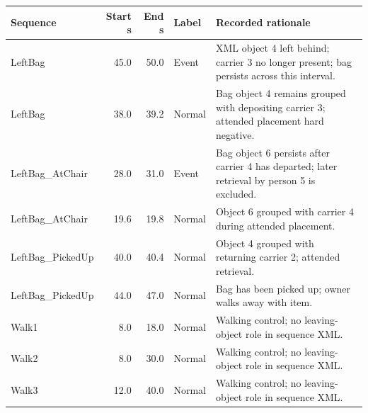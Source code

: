 \begin{longtable}{lrrlp{7cm}}
\toprule
Sequence & Start s & End s & Label & Recorded rationale \\
\midrule\endhead
LeftBag & 45.0 & 50.0 & Event & XML object 4 left behind; carrier 3 no longer present; bag persists across this interval. \\
LeftBag & 38.0 & 39.2 & Normal & Bag object 4 remains grouped with depositing carrier 3; attended placement hard negative. \\
LeftBag\_AtChair & 28.0 & 31.0 & Event & Bag object 6 persists after carrier 4 has departed; later retrieval by person 5 is excluded. \\
LeftBag\_AtChair & 19.6 & 19.8 & Normal & Object 6 grouped with carrier 4 during attended placement. \\
LeftBag\_PickedUp & 40.0 & 40.4 & Normal & Object 4 grouped with returning carrier 2; attended retrieval. \\
LeftBag\_PickedUp & 44.0 & 47.0 & Normal & Bag has been picked up; owner walks away with item. \\
Walk1 & 8.0 & 18.0 & Normal & Walking control; no leaving-object role in sequence XML. \\
Walk2 & 8.0 & 30.0 & Normal & Walking control; no leaving-object role in sequence XML. \\
Walk3 & 12.0 & 40.0 & Normal & Walking control; no leaving-object role in sequence XML. \\
\bottomrule
\end{longtable}
